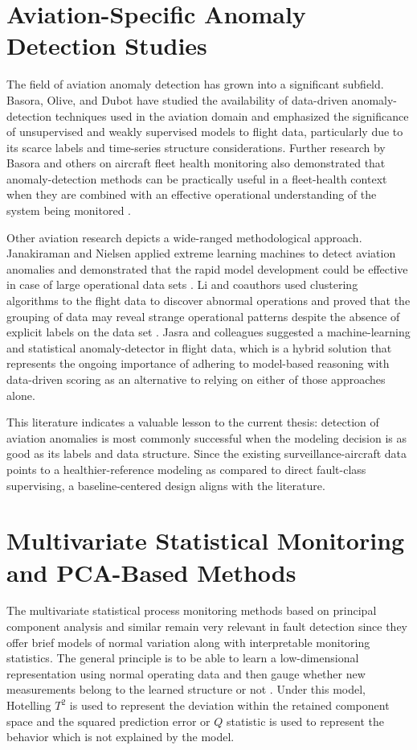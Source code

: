 \documentclass[12pt,a4paper]{report}
\begin{document}
	\section{Aviation-Specific Anomaly Detection Studies}
	
	The field of aviation anomaly detection has grown into a significant subfield. Basora, Olive, and Dubot have studied the availability of data-driven anomaly-detection techniques used in the aviation domain and emphasized the significance of unsupervised and weakly supervised models to flight data, particularly due to its scarce labels and time-series structure considerations. Further research by Basora and others on aircraft fleet health monitoring also demonstrated that anomaly-detection methods can be practically useful in a fleet-health context when they are combined with an effective operational understanding of the system being monitored \cite{basora2021fleet}.
	
	Other aviation research depicts a wide-ranged methodological approach. Janakiraman and Nielsen applied extreme learning machines to detect aviation anomalies and demonstrated that the rapid model development could be effective in case of large operational data sets \cite{janakiraman2016elm}. Li and coauthors used clustering algorithms to the flight data to discover abnormal operations and proved that the grouping of data may reveal strange operational patterns despite the absence of explicit labels on the data set \cite{li2015clustering}. Jasra and colleagues suggested a machine-learning and statistical anomaly-detector in flight data, which is a hybrid solution that represents the ongoing importance of adhering to model-based reasoning with data-driven scoring as an alternative to relying on either of those approaches alone.
	
	This literature indicates a valuable lesson to the current thesis: detection of aviation anomalies is most commonly successful when the modeling decision is as good as its labels and data structure. Since the existing surveillance-aircraft data points to a healthier-reference modeling as compared to direct fault-class supervising, a baseline-centered design aligns with the literature.
	
	\section{Multivariate Statistical Monitoring and PCA-Based Methods}
	
	The multivariate statistical process monitoring methods based on principal component analysis and similar remain very relevant in fault detection since they offer brief models of normal variation along with interpretable monitoring statistics. The general principle is to be able to learn a low-dimensional representation using normal operating data and then gauge whether new measurements belong to the learned structure or not \cite{macgregor1994overview,macgregor1995spc,kourti1995batch}. Under this model, Hotelling $T^2$ is used to represent the deviation within the retained component space and the squared prediction error or $Q$ statistic is used to represent the behavior which is not explained by the model.
	
\end{document}
